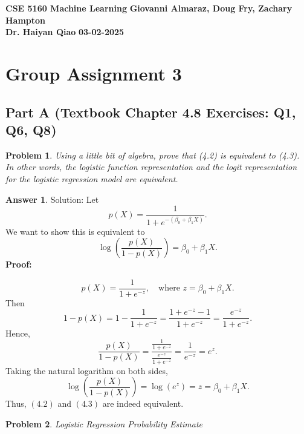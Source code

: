 \documentclass[12pt]{article}
\newtheorem{problem}{Problem} %
\theoremstyle{definition}
\newtheorem*{answer}{Answer}
\newcommand{\solution}{\textcolor{PineGreen}{Solution:\newline}}
\begin{document}
\begin{center}
\textbf{CSE 5160 Machine Learning} \hfill \textbf{Giovanni Almaraz, Doug Fry, Zachary Hampton}\\
\textbf{Dr. Haiyan Qiao} \hfill \textbf{03-02-2025}
\end{center}

\bigskip

\section*{Group Assignment 3}

\subsection*{Part A (Textbook Chapter 4.8 Exercises: Q1, Q6, Q8)}

\begin{problem}
\textbf{} Using a little bit of algebra, prove that (4.2) is equivalent to (4.3). In other words, the logistic function representation and the logit representation for the logistic regression model are equivalent.
\end{problem}

\begin{answer}
\solution
Let 
\[
p(X) = \frac{1}{1 + e^{-(\beta_0 + \beta_1 X)}}.
\]
We want to show this is equivalent to
\[
\log\left(\frac{p(X)}{1 - p(X)}\right) = \beta_0 + \beta_1 X.
\]
\textbf{Proof:}

\[
p(X) = \frac{1}{1 + e^{-z}}, \quad \text{where } z = \beta_0 + \beta_1 X.
\]
Then
\[
1 - p(X) 
= 1 - \frac{1}{1 + e^{-z}}
= \frac{1 + e^{-z} - 1}{1 + e^{-z}}
= \frac{e^{-z}}{1 + e^{-z}}.
\]
Hence,
\[
\frac{p(X)}{1 - p(X)} 
= \frac{\frac{1}{1 + e^{-z}}}{\frac{e^{-z}}{1 + e^{-z}}}
= \frac{1}{e^{-z}} 
= e^z.
\]
Taking the natural logarithm on both sides,
\[
\log\left(\frac{p(X)}{1 - p(X)}\right) = \log(e^z) = z = \beta_0 + \beta_1 X.
\]
Thus, \((4.2)\) and \((4.3)\) are indeed equivalent.
\end{answer}

\setcounter{problem}{5}
\begin{problem}
\textbf{} Logistic Regression Probability Estimate
\end{problem}
\end{document}
